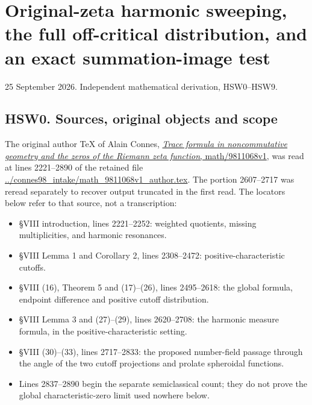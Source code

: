 \section{Original-zeta harmonic sweeping, the full off-critical
distribution, and an exact summation-image
test}\label{original-zeta-harmonic-sweeping-the-full-off-critical-distribution-and-an-exact-summation-image-test}

25 September 2026. Independent mathematical derivation, HSW0--HSW9.

\subsection{HSW0. Sources, original objects and
scope}\label{hsw0.-sources-original-objects-and-scope}

The original author TeX of Alain Connes,
\href{https://arxiv.org/abs/math/9811068v1}{\emph{Trace formula in
noncommutative geometry and the zeros of the Riemann zeta function},
math/9811068v1}, was read at lines 2221--2890 of the retained file
\href{https://arxiv.org/abs/math/9811068v1}{../connes98\_intake/math\_9811068v1\_author.tex}.
The portion 2607--2717 was reread separately to recover output truncated
in the first read. The locators below refer to that source, not a
transcription:

\begin{itemize}
\tightlist
\item
  §VIII introduction, lines 2221--2252: weighted quotients, missing
  multiplicities, and harmonic resonances.
\item
  §VIII Lemma 1 and Corollary 2, lines 2308--2472:
  positive-characteristic cutoffs.
\item
  §VIII (16), Theorem 5 and (17)--(26), lines 2495--2618: the global
  formula, endpoint difference and positive cutoff distribution.
\item
  §VIII Lemma 3 and (27)--(29), lines 2620--2708: the harmonic measure
  formula, in the positive-characteristic setting.
\item
  §VIII (30)--(33), lines 2717--2833: the proposed number-field passage
  through the angle of the two cutoff projections and prolate spheroidal
  functions.
\item
  Lines 2837--2890 begin the separate semiclassical count; they do not
  prove the global characteristic-zero limit used nowhere below.
\end{itemize}

